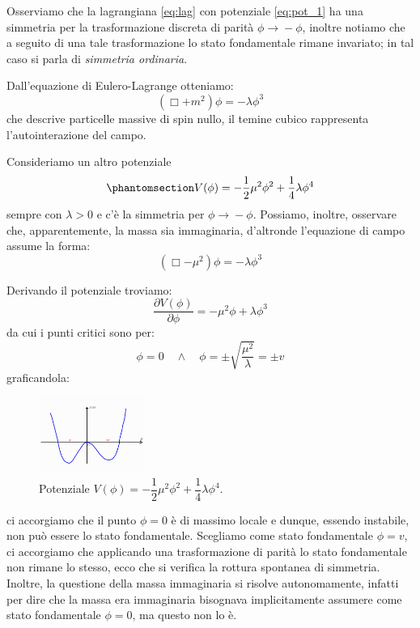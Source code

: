 Osserviamo che la lagrangiana \eqref{eq:lag} con potenziale \eqref{eq:pot_1} ha una simmetria per la trasformazione discreta di parità $\phi\xrightarrow{}-\phi$, inoltre notiamo che a seguito di una tale trasformazione lo stato fondamentale rimane invariato; in tal caso si parla di \textit{simmetria ordinaria}.

Dall'equazione di Eulero-Lagrange otteniamo:
\begin{equation}
    (\Box+m^2)\phi=-\lambda\phi^3
\end{equation}
che descrive particelle massive di spin nullo, il temine cubico rappresenta l'autointerazione del campo.

 Consideriamo un altro potenziale
 \begin{equation}\phantomsection\label{eq:pot_2}
    V(\phi)=-\dfrac{1}{2}\mu^2\phi^2+\dfrac{1}{4}\lambda\phi^4
\end{equation}
sempre con $\lambda>0$ e c'è la simmetria per $\phi\xrightarrow{}-\phi$. Possiamo, inoltre, osservare che, apparentemente, la massa sia immaginaria, d'altronde l'equazione di campo assume la forma:
\begin{equation}
    (\Box-\mu^2)\phi=-\lambda\phi^3
\end{equation}

Derivando il potenziale troviamo:
 \begin{equation}
    \dfrac{\partial V(\phi)}{\partial \phi}=-\mu^2\phi+\lambda\phi^3
\end{equation}
da cui i punti critici sono per:
\begin{equation}
   \phi=0 \quad\land\quad\phi=\pm\sqrt{\dfrac{\mu^2}{\lambda}}=\pm v
\end{equation}
graficandola:
\begin{figure}[H]
    \centering
    \includegraphics[width=0.31\textwidth]{Immagini/Pot2.jpg}
    \caption{Potenziale $ V(\phi)=-\dfrac{1}{2}\mu^2\phi^2+\dfrac{1}{4}\lambda\phi^4$.}
    \label{fig:pot2}
\end{figure}
ci accorgiamo che il punto $\phi=0$ è di massimo locale e dunque, essendo instabile, non può essere lo stato fondamentale. Scegliamo come stato fondamentale $\phi=v$, ci accorgiamo che applicando una trasformazione di parità lo stato fondamentale non rimane lo stesso, ecco che si verifica la rottura spontanea di simmetria.
Inoltre, la questione della massa immaginaria si risolve autonomamente, infatti per dire che la massa era immaginaria bisognava implicitamente assumere come stato fondamentale $\phi=0$, ma questo non lo è.

